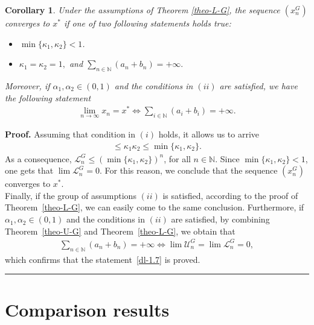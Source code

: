 \documentclass[a4paper, 11pt]{article}
\newtheorem{corollary}[theorem]{Corollary}
\newenvironment{proof}[1][Proof]{\textbf{#1.} }{\hfill\rule{0.5em}{0.5em}}
\begin{document}
\begin{corollary}\label{cor-G}
Under the assumptions of Theorem \ref{theo-L-G}, the sequence $(x_n^G)$ converges to $x^*$ if one of two following statements holds true:
\begin{itemize}
\item [(i)] $\min\{\kappa_1,\kappa_2\} <1$.
\item [(ii)] $\kappa_1=\kappa_2=1,$ and $\displaystyle \sum_{n \in\mathbb{N}}{(a_n+b_n)}=+\infty.$
\end{itemize}
Moreover, if $\alpha_1,\alpha_2 \in (0,1)$ and the conditions in $(ii)$ are satisfied, we have the following statement
\begin{align} \label{dl-1.7}
\lim_{n \to \infty}{x_n}=x^* \Longleftrightarrow \sum\limits_{i\in \mathbb N}{(a_i+b_i)}=+\infty.
\end{align}
\end{corollary}
\begin{proof}
Assuming that condition in $(i)$ holds, it allows us to arrive 
\begin{align*}
[\kappa_1-(\kappa_1+\alpha_1)a_n][\kappa_2-(\kappa_2+\alpha_2)b_n] \le  \kappa_1  \kappa_2 \le \min\{\kappa_1,\kappa_2\}.
\end{align*}
As a consequence, $\mathcal{L}_n^G \le (\min\{\kappa_1,\kappa_2\})^n$, for all $n \in \mathbb{N}$. Since $\min\{\kappa_1,\kappa_2\} < 1$, one gets that $\lim {\mathcal{L}_n^G}=0$. For this reason, we conclude that the sequence $(x_n^G)$ converges to $x^*$.\\

Finally, if the group of assumptions $(ii)$ is satisfied, according to the proof of Theorem~\ref{theo-L-G}, we can easily come to the same conclusion. Furthermore, if $\alpha_1,\alpha_2 \in (0,1)$ and the conditions in $(ii)$ are satisfied, by combining Theorem~\ref{theo-U-G} and Theorem~\ref{theo-L-G}, we obtain that
\begin{align*}
\sum_{n \in\mathbb{N}}{(a_n+b_n)} = +\infty \Longleftrightarrow \lim{\mathcal{U}_n^G}=\lim{\mathcal{L}_n^G}=0,
\end{align*}
which confirms that the statement~\eqref{dl-1.7} is proved.
\end{proof}

\section{Comparison results}\label{Sec4}
\end{document}
